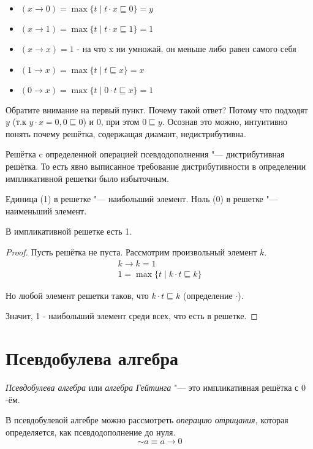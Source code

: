 \begin{itemize}
	\item $(x \to 0) = \max \{t \mid t \cdot x \sqsubseteq 0 \} = y$
	\item $(x \to 1) = \max \{t \mid t \cdot x \sqsubseteq 1 \} = 1$
	\item $(x \to x) = 1$	- на что x ни умножай, он меньше либо равен самого себя
	\item $(1 \to x) = \max \{t \mid t \sqsubseteq x \} = x$
	\item $(0 \to x) = \max \{t \mid 0 \cdot t \sqsubseteq x \} = 1$	
\end{itemize}
Обратите внимание на первый пункт. Почему такой ответ? Потому что подходят $y$ (т.к $y \cdot x = 0, 0 \sqsubseteq 0$) и $0$, при этом $0 \sqsubseteq y $. Осознав это можно, интуитивно понять почему решётка, содержащая диамант, недистрибутивна.

\begin{theorem}
	Решётка c определенной операцией псевдодополнения "--- дистрибутивная решётка. То есть явно выписанное требование дистрибутивности в определении импликативной решетки было избыточным.
\end{theorem}

\begin{definition} 
	Единица (1) в решетке "--- наибольший элемент. 
	Ноль (0) в решетке "--- наименьший элемент. 
\end{definition}

\begin{theorem}
	В импликативной решетке есть 1.
\end{theorem}
\begin{proof}
	Пусть решётка не пуста. Рассмотрим произвольный элемент $k$. 
	\begin{gather*}
	k \to k = 1 \\
	1 = \max \{t \mid k \cdot t \sqsubseteq k \}
	\end{gather*}
	
	Но любой элемент решетки таков, что  $k \cdot t \sqsubseteq k$ (определение $\cdot$).
	
	Значит, 1 - наибольший элемент среди всех, что есть в решетке.
\end{proof}


\section{Псевдобулева алгебра}
\begin{definition}
	\emph{Псевдобулева алгебра} или \emph{алгебра Гейтинга} "--- это импликативная решётка с $0$-ём.
\end{definition}
В псевдобулевой алгебре можно рассмотреть \emph{операцию отрицания}, которая определяется, как псевдодополнение до нуля.
\[\sim a \equiv	a \to 0\]

